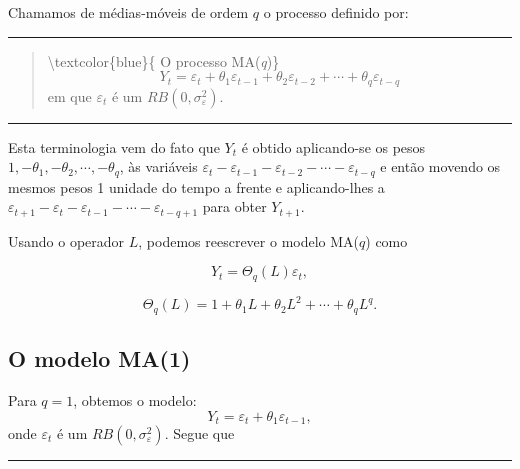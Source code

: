 \documentclass[
]{book}
\theoremstyle{definition}
\theoremstyle{definition}
\theoremstyle{definition}
\theoremstyle{remark}
\begin{document}
Chamamos de médias-móveis de ordem \(q\) o processo definido por:

\begin{center}\rule{0.5\linewidth}{0.5pt}\end{center}

\begin{quote}
\textbackslash textcolor\{blue\}\{ O processo MA(\emph{q})\}\\
\[
Y_t= \varepsilon_t + \theta_1 \varepsilon_{t-1} + \theta_2 \varepsilon_{t-2} +\cdots + \theta_q \varepsilon_{t-q}
\]
em que \(\varepsilon_t\) é um \(RB(0,\sigma_\varepsilon^2)\).
\end{quote}

\begin{center}\rule{0.5\linewidth}{0.5pt}\end{center}

Esta terminologia vem do fato que \(Y_t\) é obtido aplicando-se os pesos \(1,-\theta_1, -\theta_2, \cdots, -\theta_q\), às variáveis \(\varepsilon_t - \varepsilon_{t-1} - \varepsilon_{t-2} -\cdots - \varepsilon_{t-q}\) e então movendo os mesmos pesos 1 unidade do tempo a frente e aplicando-lhes a \(\varepsilon_{t+1} - \varepsilon_{t} - \varepsilon_{t-1} -\cdots - \varepsilon_{t-q+1}\) para obter \(Y_{t+1}\).

Usando o operador \(L\), podemos reescrever o modelo MA(\(q\)) como

\begin{equation}
Y_t= \Theta_q(L)\varepsilon_t,
\label{eq:maqL}
\end{equation}

\begin{equation}
\Theta_q(L)=1+ \theta_1L + \theta_2L^2  +\cdots + \theta_qL^q.
\label{eq:ThetaL}
\end{equation}

\hypertarget{o-modelo-ma1}{%
\subsection{O modelo MA(1)}\label{o-modelo-ma1}}

Para \(q=1\), obtemos o modelo:
\begin{equation}
Y_t = \varepsilon_t + \theta_1 \varepsilon_{t-1},
\label{eq:ma1}
\end{equation}
onde \(\varepsilon_t\) é um \(RB(0,\sigma_\varepsilon^2)\). Segue que

\begin{center}\rule{0.5\linewidth}{0.5pt}\end{center}
\end{document}

